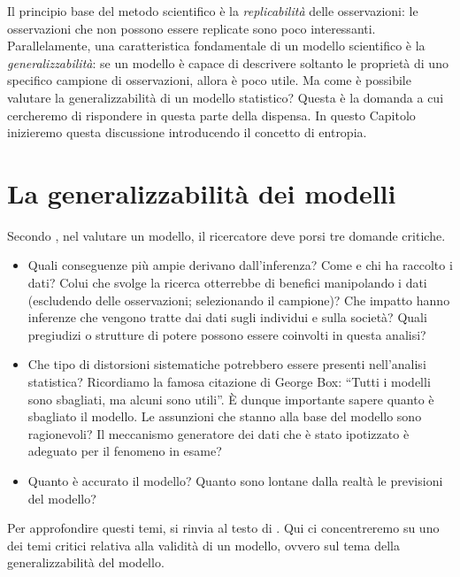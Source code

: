 \documentclass[
  11pt,
]{krantz}
\theoremstyle{definition}
\theoremstyle{definition}
\theoremstyle{definition}
\theoremstyle{definition}
\theoremstyle{remark}
\begin{document}
Il principio base del metodo scientifico è la \emph{replicabilità} delle osservazioni: le osservazioni che non possono essere replicate sono poco interessanti. Parallelamente, una caratteristica fondamentale di un modello scientifico è la \emph{generalizzabilità}: se un modello è capace di descrivere soltanto le proprietà di uno specifico campione di osservazioni, allora è poco utile. Ma come è possibile valutare la generalizzabilità di un modello statistico? Questa è la domanda a cui cercheremo di rispondere in questa parte della dispensa. In questo Capitolo inizieremo questa discussione introducendo il concetto di entropia.

\hypertarget{la-generalizzabilituxe0-dei-modelli}{%
\section{La generalizzabilità dei modelli}\label{la-generalizzabilituxe0-dei-modelli}}

Secondo \citet{Johnson2022bayesrules}, nel valutare un modello, il ricercatore deve porsi tre domande critiche.

\begin{itemize}
\item
  Quali conseguenze più ampie derivano dall'inferenza? Come e chi ha raccolto i dati? Colui che svolge la ricerca otterrebbe di benefici manipolando i dati (escludendo delle osservazioni; selezionando il campione)? Che impatto hanno inferenze che vengono tratte dai dati sugli individui e sulla società? Quali pregiudizi o strutture di potere possono essere coinvolti in questa analisi?
\item
  Che tipo di distorsioni sistematiche potrebbero essere presenti nell'analisi statistica? Ricordiamo la famosa citazione di George Box: ``Tutti i modelli sono sbagliati, ma alcuni sono utili''. È dunque importante sapere quanto è sbagliato il modello. Le assunzioni che stanno alla base del modello sono ragionevoli? Il meccanismo generatore dei dati che è stato ipotizzato è adeguato per il fenomeno in esame?
\item
  Quanto è accurato il modello? Quanto sono lontane dalla realtà le previsioni del modello?
\end{itemize}

Per approfondire questi temi, si rinvia al testo di \citet{Johnson2022bayesrules}. Qui ci concentreremo su uno dei temi critici relativa alla validità di un modello, ovvero sul tema della generalizzabilità del modello.
\end{document}
